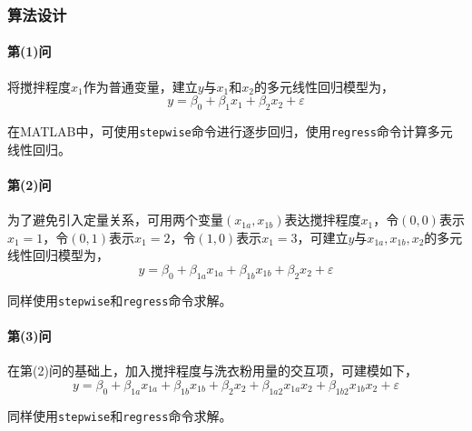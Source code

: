 
\subsubsection{算法设计}

\paragraph{第(1)问} 将搅拌程度$x_1$作为普通变量，建立$y$与$x_1$和$x_2$的多元线性回归模型为，
\begin{equation}
    y = \beta_0 + \beta_1 x_1 + \beta_2 x_2 + \varepsilon
\end{equation}

在MATLAB中，可使用\texttt{stepwise}命令进行逐步回归，使用\texttt{regress}命令计算多元线性回归。

\paragraph{第(2)问} 为了避免引入定量关系，可用两个变量$(x_{1a},x_{1b})$表达搅拌程度$x_1$，令$(0,0)$表示$x_1=1$，令$(0,1)$表示$x_1=2$，令$(1,0)$表示$x_1=3$，可建立$y$与$x_{1a},x_{1b},x_2$的多元线性回归模型为，
\begin{equation}
    y = \beta_0 + \beta_{1a} x_{1a} + \beta_{1b} x_{1b} + \beta_2 x_2 + \varepsilon
\end{equation}

同样使用\texttt{stepwise}和\texttt{regress}命令求解。

\paragraph{第(3)问} 在第(2)问的基础上，加入搅拌程度与洗衣粉用量的交互项，可建模如下，
\begin{equation}
    y = \beta_0 + \beta_{1a} x_{1a} + \beta_{1b} x_{1b} + \beta_2 x_2 + \beta_{1a2} x_{1a} x_2 + \beta_{1b2} x_{1b} x_2 + \varepsilon
\end{equation}

同样使用\texttt{stepwise}和\texttt{regress}命令求解。

